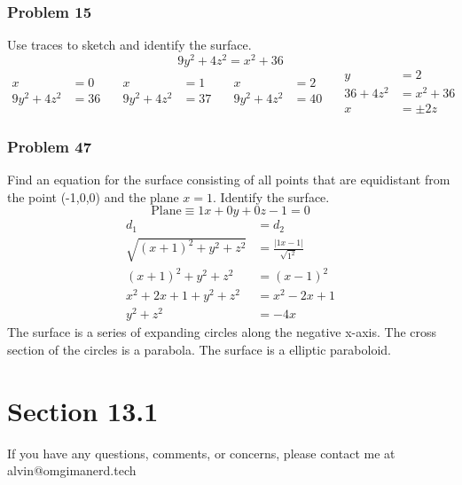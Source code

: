 \documentclass[letterpaper, 12pt]{math}
\begin{document}
\subsubsection*{Problem 15}
Use traces to sketch and identify the surface.
\[ 9y^2+4z^2 = x^2+36 \]
\[\begin{split}
  x &= 0 \\
  9y^2+4z^2 &= 36
\end{split}\quad
\begin{split}
  x &= 1 \\
  9y^2+4z^2 &= 37
\end{split}\quad
\begin{split}
  x &= 2 \\
  9y^2+4z^2 &= 40
\end{split}\quad
\begin{split}
  y &= 2 \\
  36+4z^2 &= x^2+36 \\
  x &= \pm2z
\end{split} \]

\subsubsection*{Problem 47}
Find an equation for the surface consisting of all points that are
equidistant from the point (-1,0,0) and the plane \( x = 1 \). Identify the
surface.
\[ \text{Plane} \equiv 1x+0y+0z-1 = 0 \]
\begin{align*}
  d_1 &= d_2 \\
  \sqrt{(x+1)^2+y^2+z^2} &= \frac{|1x-1|}{\sqrt{1^2}} \\
  (x+1)^2+y^2+z^2 &= (x-1)^2 \\
  x^2+2x+1+y^2+z^2 &= x^2-2x+1 \\
  y^2+z^2 &= -4x
\end{align*}
The surface is a series of expanding circles along the negative x-axis. The
cross section of the circles is a parabola. The surface is a elliptic
paraboloid.

\section*{Section 13.1}

\begin{center}
  If you have any questions, comments, or concerns, please contact me at
  alvin@omgimanerd.tech
\end{center}
\end{document}
